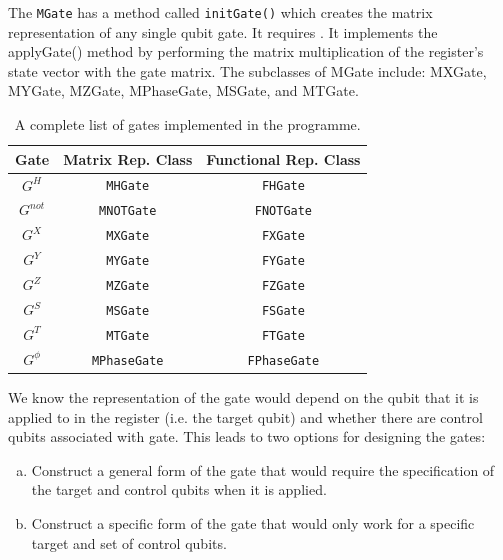 \documentclass[bibliography=totocnumbered, 10pt]{article}
\theoremstyle{NoticeStyle}
\begin{document}
\begin{myenumerate}
The \texttt{MGate} has a method called \texttt{initGate()} which creates the matrix representation of any single qubit gate. It requires . It implements the applyGate() method by performing the matrix multiplication of the register’s state vector with the gate matrix. The subclasses of MGate include: MXGate, MYGate, MZGate, MPhaseGate, MSGate, and MTGate.

\setlength{\extrarowheight}{3pt}
\begin{table}[h]
\begin{center}
\begin{tabular}{c | c | c}
	Gate & Matrix Rep. Class & Functional Rep. Class \\ \hline
	$G^H$ & \texttt{MHGate} & \texttt{FHGate} \\ 
	$G^{not}$ & \texttt{MNOTGate} & \texttt{FNOTGate} \\
	$G^{X}$ & \texttt{MXGate} & \texttt{FXGate} \\
	$G^{Y}$ & \texttt{MYGate} & \texttt{FYGate} \\
	$G^{Z}$ & \texttt{MZGate} & \texttt{FZGate} \\
	$G^{S}$ & \texttt{MSGate} & \texttt{FSGate} \\
	$G^{T}$ & \texttt{MTGate} & \texttt{FTGate} \\
	$G^{\phi}$ & \texttt{MPhaseGate} & \texttt{FPhaseGate} \\	
\end{tabular}
\caption{A complete list of gates implemented in the programme.}
\end{center}
\end{table}
	We know the representation of the gate would depend on the qubit that it is applied to in the register (i.e. the target qubit) and whether there are control qubits associated with gate. This leads to two options for designing the gates:
\begin{enumerate}[(a)]
	\item Construct a general form of the gate that would require the specification of the target and control qubits when it is applied.
	\item Construct a specific form of the gate that would only work for a specific target and set of control qubits.
\end{enumerate}

\end{myenumerate}
\end{document}
